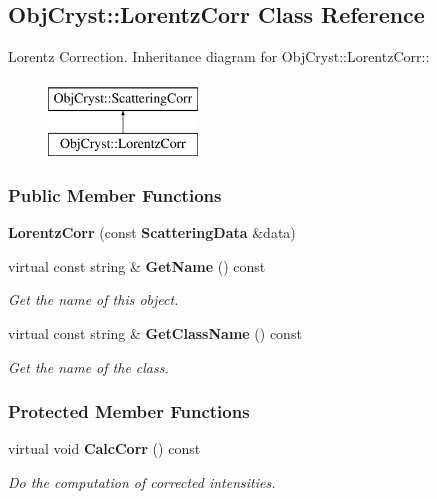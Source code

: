 \subsection{ObjCryst::LorentzCorr Class Reference}
\label{a00038}


Lorentz Correction.  
Inheritance diagram for ObjCryst::LorentzCorr::\begin{figure}[H]
\begin{center}
\leavevmode
\includegraphics[height=2cm]{a00038}
\end{center}
\end{figure}
\subsubsection*{Public Member Functions}
\begin{DoxyCompactItemize}
\item 
{\bfseries LorentzCorr} (const {\bf ScatteringData} \&data)\label{a00038_a9f814b060cfafe4e829dc3977d9a7f1b}

\item 
virtual const string \& {\bf GetName} () const \label{a00038_ab57782d9fe860701bb87309742afe2e5}

\begin{DoxyCompactList}\small\item\em Get the name of this object. \item\end{DoxyCompactList}\item 
virtual const string \& {\bf GetClassName} () const \label{a00038_a740bd7f01b62a994ad5bc1c121d1e626}

\begin{DoxyCompactList}\small\item\em Get the name of the class. \item\end{DoxyCompactList}\end{DoxyCompactItemize}
\subsubsection*{Protected Member Functions}
\begin{DoxyCompactItemize}
\item 
virtual void {\bf CalcCorr} () const \label{a00038_adc247e6477f11474c542f2979984d238}

\begin{DoxyCompactList}\small\item\em Do the computation of corrected intensities. \item\end{DoxyCompactList}\end{DoxyCompactItemize}


